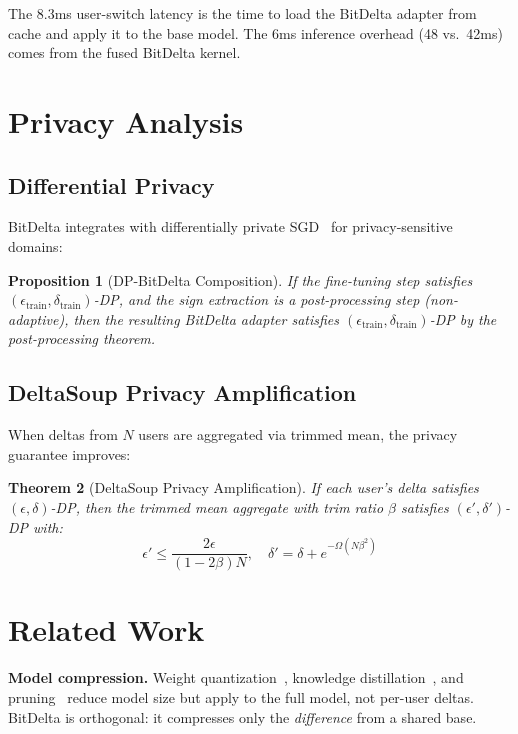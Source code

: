 \documentclass[11pt,letterpaper]{article}
\newtheorem{theorem}{Theorem}[section]
\newtheorem{proposition}[theorem]{Proposition}
\begin{document}
The 8.3ms user-switch latency is the time to load the BitDelta adapter from cache and apply it to the base model. The 6ms inference overhead (48 vs.\ 42ms) comes from the fused BitDelta kernel.

\section{Privacy Analysis}

\subsection{Differential Privacy}

BitDelta integrates with differentially private SGD~\cite{abadi2016deep} for privacy-sensitive domains:

\begin{proposition}[DP-BitDelta Composition]
If the fine-tuning step satisfies $(\epsilon_{\text{train}}, \delta_{\text{train}})$-DP, and the sign extraction is a post-processing step (non-adaptive), then the resulting BitDelta adapter satisfies $(\epsilon_{\text{train}}, \delta_{\text{train}})$-DP by the post-processing theorem.
\end{proposition}

\subsection{DeltaSoup Privacy Amplification}

When deltas from $N$ users are aggregated via trimmed mean, the privacy guarantee improves:

\begin{theorem}[DeltaSoup Privacy Amplification]
If each user's delta satisfies $(\epsilon, \delta)$-DP, then the trimmed mean aggregate with trim ratio $\beta$ satisfies $(\epsilon', \delta')$-DP with:
\[
\epsilon' \leq \frac{2\epsilon}{(1-2\beta)N}, \quad \delta' = \delta + e^{-\Omega(N\beta^2)}
\]
\end{theorem}

\section{Related Work}

\textbf{Model compression.} Weight quantization~\cite{dettmers2022gptq}, knowledge distillation~\cite{hinton2015distilling}, and pruning~\cite{frankle2018lottery} reduce model size but apply to the full model, not per-user deltas. BitDelta is orthogonal: it compresses only the \emph{difference} from a shared base.
\end{document}
